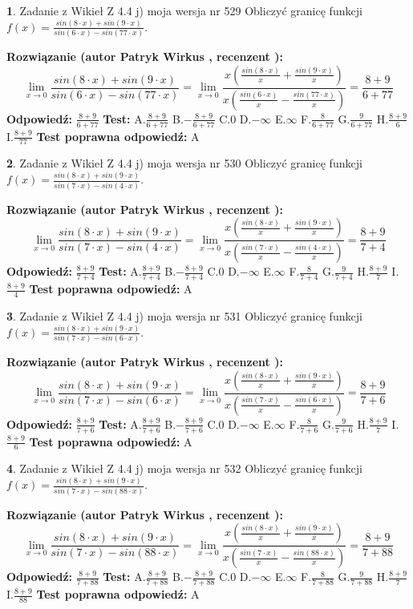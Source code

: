 \documentclass[12pt, a4paper]{article}
\theoremstyle{definition} %
\newtheorem{zad}{}
\newcommand{\zadStart}[1]{\begin{zad}#1\newline}
\newcommand{\zadStop}{\end{zad}}
\newcommand{\rozwStart}[2]{\noindent \textbf{Rozwiązanie (autor #1 , recenzent #2): }\newline}
\newcommand{\rozwStop}{\newline}
\newcommand{\odpStart}{\noindent \textbf{Odpowiedź:}\newline}
\newcommand{\odpStop}{\newline}
\newcommand{\testStart}{\noindent \textbf{Test:}\newline}
\newcommand{\testStop}{\newline}
\newcommand{\kluczStart}{\noindent \textbf{Test poprawna odpowiedź:}\newline}
\newcommand{\kluczStop}{\newline}
\begin{document}
\zadStart{Zadanie z Wikieł Z 4.4 j) moja wersja nr 529}
Obliczyć granicę funkcji $f(x)=\frac{sin(8\cdot x) +sin(9\cdot x)}{sin(6\cdot x) -sin(77\cdot x)}$.
\zadStop
\rozwStart{Patryk Wirkus}{}
$$\lim\limits_{x\to 0}\frac{sin(8\cdot x) +sin(9\cdot x)}{sin(6\cdot x) -sin(77\cdot x)}=\lim\limits_{x\to 0}\frac{x(\frac{sin(8\cdot x)}{x}+\frac{sin(9\cdot x)}{x})}{x(\frac{sin(6\cdot x)}{x}-\frac{sin(77\cdot x)}{x})}=\frac{8+9}{6+77}$$
\rozwStop
\odpStart
$\frac{8+9}{6+77}$
\odpStop
\testStart
A.$\frac{8+9}{6+77}$
B.$-\frac{8+9}{6+77}$
C.$0$
D.$-\infty$
E.$\infty$
F.$\frac{8}{6+77}$
G.$\frac{9}{6+77}$
H.$\frac{8+9}{6}$
I.$\frac{8+9}{77}$
\testStop
\kluczStart
A
\kluczStop



\zadStart{Zadanie z Wikieł Z 4.4 j) moja wersja nr 530}
Obliczyć granicę funkcji $f(x)=\frac{sin(8\cdot x) +sin(9\cdot x)}{sin(7\cdot x) -sin(4\cdot x)}$.
\zadStop
\rozwStart{Patryk Wirkus}{}
$$\lim\limits_{x\to 0}\frac{sin(8\cdot x) +sin(9\cdot x)}{sin(7\cdot x) -sin(4\cdot x)}=\lim\limits_{x\to 0}\frac{x(\frac{sin(8\cdot x)}{x}+\frac{sin(9\cdot x)}{x})}{x(\frac{sin(7\cdot x)}{x}-\frac{sin(4\cdot x)}{x})}=\frac{8+9}{7+4}$$
\rozwStop
\odpStart
$\frac{8+9}{7+4}$
\odpStop
\testStart
A.$\frac{8+9}{7+4}$
B.$-\frac{8+9}{7+4}$
C.$0$
D.$-\infty$
E.$\infty$
F.$\frac{8}{7+4}$
G.$\frac{9}{7+4}$
H.$\frac{8+9}{7}$
I.$\frac{8+9}{4}$
\testStop
\kluczStart
A
\kluczStop



\zadStart{Zadanie z Wikieł Z 4.4 j) moja wersja nr 531}
Obliczyć granicę funkcji $f(x)=\frac{sin(8\cdot x) +sin(9\cdot x)}{sin(7\cdot x) -sin(6\cdot x)}$.
\zadStop
\rozwStart{Patryk Wirkus}{}
$$\lim\limits_{x\to 0}\frac{sin(8\cdot x) +sin(9\cdot x)}{sin(7\cdot x) -sin(6\cdot x)}=\lim\limits_{x\to 0}\frac{x(\frac{sin(8\cdot x)}{x}+\frac{sin(9\cdot x)}{x})}{x(\frac{sin(7\cdot x)}{x}-\frac{sin(6\cdot x)}{x})}=\frac{8+9}{7+6}$$
\rozwStop
\odpStart
$\frac{8+9}{7+6}$
\odpStop
\testStart
A.$\frac{8+9}{7+6}$
B.$-\frac{8+9}{7+6}$
C.$0$
D.$-\infty$
E.$\infty$
F.$\frac{8}{7+6}$
G.$\frac{9}{7+6}$
H.$\frac{8+9}{7}$
I.$\frac{8+9}{6}$
\testStop
\kluczStart
A
\kluczStop



\zadStart{Zadanie z Wikieł Z 4.4 j) moja wersja nr 532}
Obliczyć granicę funkcji $f(x)=\frac{sin(8\cdot x) +sin(9\cdot x)}{sin(7\cdot x) -sin(88\cdot x)}$.
\zadStop
\rozwStart{Patryk Wirkus}{}
$$\lim\limits_{x\to 0}\frac{sin(8\cdot x) +sin(9\cdot x)}{sin(7\cdot x) -sin(88\cdot x)}=\lim\limits_{x\to 0}\frac{x(\frac{sin(8\cdot x)}{x}+\frac{sin(9\cdot x)}{x})}{x(\frac{sin(7\cdot x)}{x}-\frac{sin(88\cdot x)}{x})}=\frac{8+9}{7+88}$$
\rozwStop
\odpStart
$\frac{8+9}{7+88}$
\odpStop
\testStart
A.$\frac{8+9}{7+88}$
B.$-\frac{8+9}{7+88}$
C.$0$
D.$-\infty$
E.$\infty$
F.$\frac{8}{7+88}$
G.$\frac{9}{7+88}$
H.$\frac{8+9}{7}$
I.$\frac{8+9}{88}$
\testStop
\kluczStart
A
\kluczStop
\end{document}
